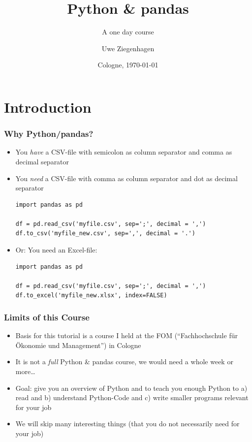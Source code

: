 \documentclass[ngerman]{beamer}
\author{Uwe Ziegenhagen}
\title{Python \& pandas}
\subtitle{A one day course}
\institute{\url{github.com/UweZiegenhagen/OneDayPythonPandasCourse}}
\date{Cologne, \today}
\begin{document}
\begin{frame}

\maketitle

\end{frame}

\section{Introduction}

\begin{frame}[fragile]
\frametitle{Why Python/pandas?}

\begin{itemize}
	\item You \textit{have} a CSV-file with semicolon as column separator and comma as decimal separator
	\item You \textit{need} a CSV-file with comma as column separator and dot as decimal separator


\begin{lstlisting}
import pandas as pd

df = pd.read_csv('myfile.csv', sep=';', decimal = ',')
df.to_csv('myfile_new.csv', sep=',', decimal = '.')
\end{lstlisting}

	\item Or: You need an Excel-file:


\begin{lstlisting}
import pandas as pd

df = pd.read_csv('myfile.csv', sep=';', decimal = ',')
df.to_excel('myfile_new.xlsx', index=FALSE)
\end{lstlisting}

\end{itemize}

\end{frame}

\begin{frame}
\frametitle{Limits of this Course}

\begin{itemize}
\item Basis for this tutorial is a course I held at the FOM (\enquote{Fachhochschule für Ökonomie und Management}) in Cologne 
\item It is not a \textit{full} Python \& pandas course, we would need a whole week or more\ldots
\item Goal: give you an overview of Python and to teach you enough Python to a) read and b) understand Python-Code and c) write smaller programs relevant for your job 
\item We will skip many interesting things (that you do not necessarily need for your job)
\end{itemize}
\end{frame}
\end{document}
